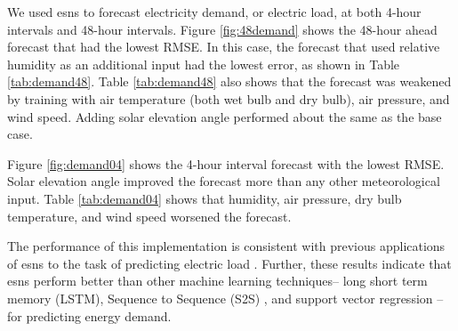 We used \glspl{esn} to forecast electricity demand, or electric load, at both
4-hour intervals and 48-hour intervals. Figure \ref{fig:48demand} shows the
48-hour ahead forecast that had the lowest RMSE. In this case, the forecast
that used relative humidity as an additional input had the lowest error, as
shown in Table \ref{tab:demand48}. Table \ref{tab:demand48} also shows that the
forecast was weakened by training with air temperature (both wet bulb and dry
bulb), air pressure, and wind speed. Adding solar elevation angle performed
about the same as the base case.

Figure \ref{fig:demand04} shows the 4-hour interval forecast with the lowest
RMSE. Solar elevation angle improved the
forecast more than any other meteorological input. Table \ref{tab:demand04}
shows that humidity, air pressure, dry bulb temperature, and wind speed
worsened the forecast.

The performance of this implementation is consistent with previous applications
of \glspl{esn} to the task of predicting electric load
\cite{deihimi_application_2012}. Further, these results indicate that
\glspl{esn} perform better than other machine learning techniques-- long
short term memory (LSTM)\cite{marino_building_2016}, Sequence to Sequence (S2S)
\cite{marino_building_2016}, and support vector regression \cite{chen_day-ahead_2017}-- for predicting energy demand.

\begin{figure*}[h]
  \centering
  
  \caption{The optimized 48-hour ahead demand prediction. The inputs for this
  forecast were hourly demand and relative humidity. \textit{Hyperparameters}:
  Reservoir Size: 1500, Sparsity: 0.2, Spectral Radius: 1.5, Noise: 0.0007,
  Training Length: 5000, Prediction Window: 48, Random state: 85}
  \label{fig:48demand}
\end{figure*}

